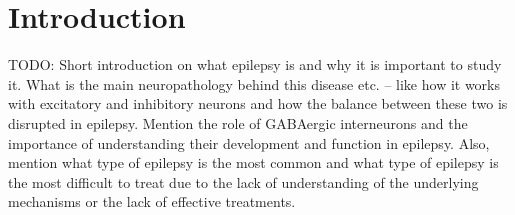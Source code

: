 \documentclass[10pt]{article}
\begin{document}
\begin{sloppypar}
  \begin{abstract}
  \end{abstract}

  \pagebreak
  \tableofcontents
  \pagebreak
  \listoffigures
  \pagebreak


  \section{Introduction}
  \label{sec:introduction}

  TODO: Short introduction on what epilepsy is and why it is important to study it. What is the main neuropathology behind this disease etc. – like how it works with excitatory and inhibitory neurons and how the balance between these two is disrupted in epilepsy. Mention the role of GABAergic interneurons and the importance of understanding their development and function in epilepsy. Also, mention what type of epilepsy is the most common and what type of epilepsy is the most difficult to treat due to the lack of understanding of the underlying mechanisms or the lack of effective treatments.


\end{sloppypar}
\end{document}
